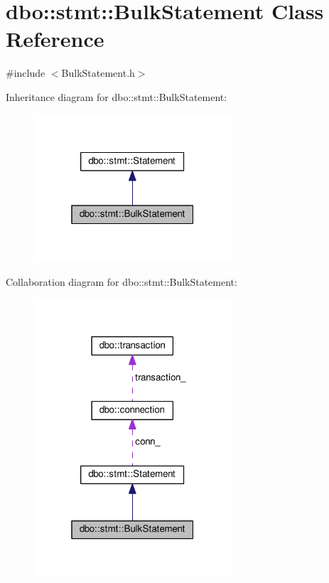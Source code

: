 \hypertarget{classdbo_1_1stmt_1_1_bulk_statement}{\section{dbo\+:\+:stmt\+:\+:Bulk\+Statement Class Reference}
\label{classdbo_1_1stmt_1_1_bulk_statement}
}


{\ttfamily \#include $<$Bulk\+Statement.\+h$>$}



Inheritance diagram for dbo\+:\+:stmt\+:\+:Bulk\+Statement\+:\nopagebreak
\begin{figure}[H]
\begin{center}
\leavevmode
\includegraphics[width=208pt]{classdbo_1_1stmt_1_1_bulk_statement__inherit__graph}
\end{center}
\end{figure}


Collaboration diagram for dbo\+:\+:stmt\+:\+:Bulk\+Statement\+:\nopagebreak
\begin{figure}[H]
\begin{center}
\leavevmode
\includegraphics[width=208pt]{classdbo_1_1stmt_1_1_bulk_statement__coll__graph}
\end{center}
\end{figure}
